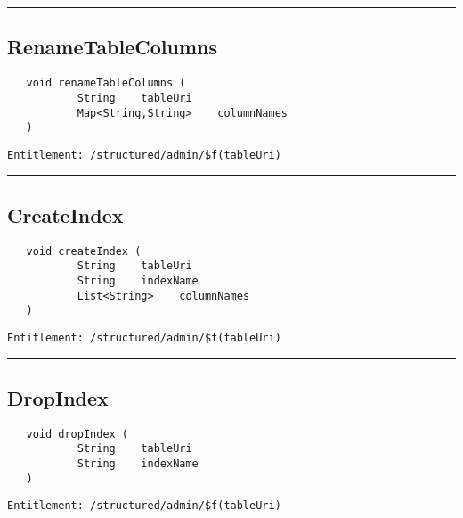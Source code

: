 \rule{12cm}{2pt}
\subsection{RenameTableColumns}
\label{Api:RenameTableColumns}
\begin{Verbatim}
   void renameTableColumns (
           String    tableUri
           Map<String,String>    columnNames
   )
\end{Verbatim}
\begin{Verbatim}[formatcom=\color{Maroon}]
  Entitlement: /structured/admin/$f(tableUri)
\end{Verbatim}



\rule{12cm}{2pt}
\subsection{CreateIndex}
\label{Api:CreateIndex}
\begin{Verbatim}
   void createIndex (
           String    tableUri
           String    indexName
           List<String>    columnNames
   )
\end{Verbatim}
\begin{Verbatim}[formatcom=\color{Maroon}]
  Entitlement: /structured/admin/$f(tableUri)
\end{Verbatim}



\rule{12cm}{2pt}
\subsection{DropIndex}
\label{Api:DropIndex}
\begin{Verbatim}
   void dropIndex (
           String    tableUri
           String    indexName
   )
\end{Verbatim}
\begin{Verbatim}[formatcom=\color{Maroon}]
  Entitlement: /structured/admin/$f(tableUri)
\end{Verbatim}



